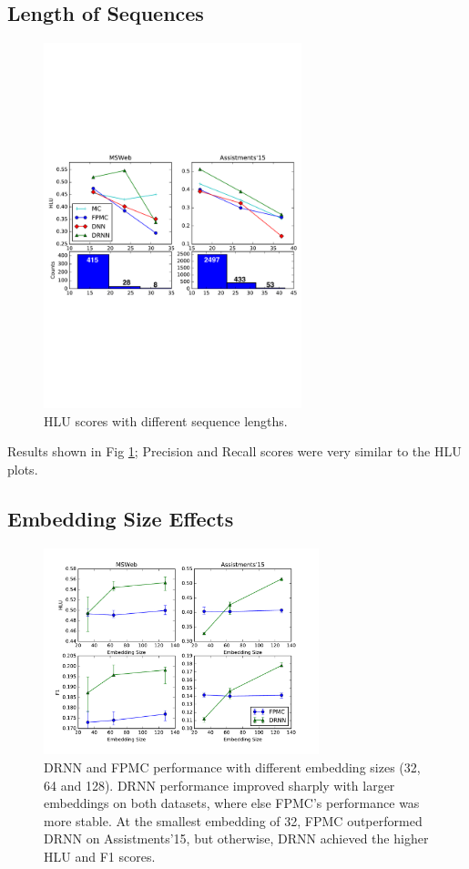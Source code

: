 \documentclass{sig-alternate-05-2015}
\begin{document}
\subsection{Length of Sequences}
\begin{figure}
\centering
\includegraphics[width=7.5cm]{images/SeqLenPerfAnnotated}		
\caption{HLU scores with different sequence lengths.}
\label{fig:SeqLenResults}
\end{figure}
Results shown in Fig \ref{fig:SeqLenResults}; Precision and Recall scores were very similar to the HLU plots. 

\subsection{Embedding Size Effects}
\begin{figure}
\centering
\includegraphics[width=8cm]{images/EmbPerf}		
\caption{DRNN and FPMC performance with different embedding sizes (32, 64 and 128). DRNN performance improved sharply with larger embeddings on both datasets, where else FPMC's performance was more stable. At the smallest embedding of 32, FPMC outperformed DRNN on Assistments'15, but otherwise, DRNN achieved the higher HLU and F1 scores.}
\label{fig:EmbResults}
\end{figure}
\end{document}

